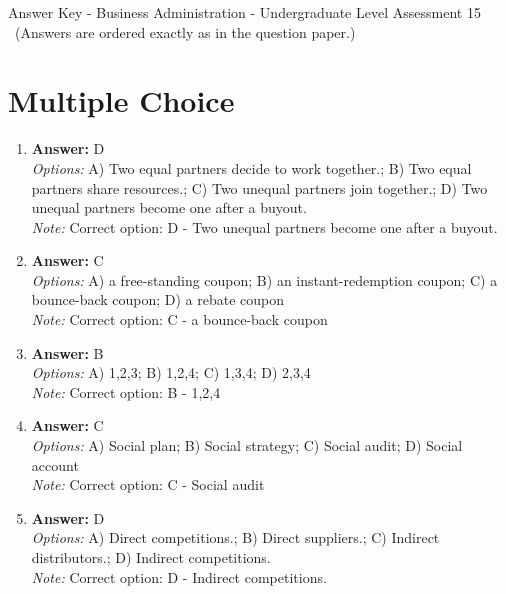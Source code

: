 \documentclass[12pt]{article}
\begin{document}
\begin{center}
Answer Key - Business Administration - Undergraduate Level Assessment 15 \
\small (Answers are ordered exactly as in the question paper.)
\end{center}

\section*{Multiple Choice}
\begin{enumerate}[label=\arabic*.]
\item \textbf{Answer:} D
\\ \textit{Options:} A) Two equal partners decide to work together.; B) Two equal partners share resources.; C) Two unequal partners join together.; D) Two unequal partners become one after a buyout.
\\ \textit{Note:} Correct option: D - Two unequal partners become one after a buyout.
\item \textbf{Answer:} C
\\ \textit{Options:} A) a free-standing coupon; B) an instant-redemption coupon; C) a bounce-back coupon; D) a rebate coupon
\\ \textit{Note:} Correct option: C - a bounce-back coupon
\item \textbf{Answer:} B
\\ \textit{Options:} A) 1,2,3; B) 1,2,4; C) 1,3,4; D) 2,3,4
\\ \textit{Note:} Correct option: B - 1,2,4
\item \textbf{Answer:} C
\\ \textit{Options:} A) Social plan; B) Social strategy; C) Social audit; D) Social account
\\ \textit{Note:} Correct option: C - Social audit
\item \textbf{Answer:} D
\\ \textit{Options:} A) Direct competitions.; B) Direct suppliers.; C) Indirect distributors.; D) Indirect competitions.
\\ \textit{Note:} Correct option: D - Indirect competitions.
\end{enumerate}
\end{document}
